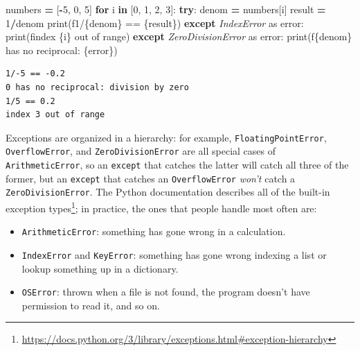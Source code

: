 \documentclass[
]{krantz}
\makeatletter
\newenvironment{Shaded}{\begin{snugshade}}{\end{snugshade}}
\newcommand{\BuiltInTok}[1]{#1}
\newcommand{\ControlFlowTok}[1]{\textcolor[rgb]{0.13,0.29,0.53}{\textbf{#1}}}
\newcommand{\DecValTok}[1]{\textcolor[rgb]{0.00,0.00,0.81}{#1}}
\newcommand{\ImportTok}[1]{#1}
\newcommand{\KeywordTok}[1]{\textcolor[rgb]{0.13,0.29,0.53}{\textbf{#1}}}
\newcommand{\NormalTok}[1]{#1}
\newcommand{\OperatorTok}[1]{\textcolor[rgb]{0.81,0.36,0.00}{\textbf{#1}}}
\newcommand{\PreprocessorTok}[1]{\textcolor[rgb]{0.56,0.35,0.01}{\textit{#1}}}
\newcommand{\SpecialCharTok}[1]{\textcolor[rgb]{0.00,0.00,0.00}{#1}}
\newcommand{\SpecialStringTok}[1]{\textcolor[rgb]{0.31,0.60,0.02}{#1}}
\providecommand{\tightlist}{%
  \setlength{\itemsep}{0pt}\setlength{\parskip}{0pt}}
\renewcommand{\href}[2]{#2\footnote{\url{#1}}}
\newenvironment{kframe}{%
\medskip{}
\setlength{\fboxsep}{.8em}
 \def\at@end@of@kframe{}%
 \ifinner\ifhmode%
  \def\at@end@of@kframe{\end{minipage}}%
  \begin{minipage}{\columnwidth}%
 \fi\fi%
 \def\FrameCommand##1{\hskip\@totalleftmargin \hskip-\fboxsep
 \colorbox{shadecolor}{##1}\hskip-\fboxsep
     \hskip-\linewidth \hskip-\@totalleftmargin \hskip\columnwidth}%
 \MakeFramed {\advance\hsize-\width
   \@totalleftmargin\z@ \linewidth\hsize
   \@setminipage}}%
 {\par\unskip\endMakeFramed%
 \at@end@of@kframe}
\renewenvironment{Shaded}{\begin{kframe}}{\end{kframe}}
\makeatother
\begin{document}
\begin{Shaded}
\begin{Highlighting}[]
\NormalTok{numbers }\OperatorTok{=}\NormalTok{ [}\OperatorTok{{-}}\DecValTok{5}\NormalTok{, }\DecValTok{0}\NormalTok{, }\DecValTok{5}\NormalTok{]}
\ControlFlowTok{for}\NormalTok{ i }\KeywordTok{in}\NormalTok{ [}\DecValTok{0}\NormalTok{, }\DecValTok{1}\NormalTok{, }\DecValTok{2}\NormalTok{, }\DecValTok{3}\NormalTok{]:}
    \ControlFlowTok{try}\NormalTok{:}
\NormalTok{        denom }\OperatorTok{=}\NormalTok{ numbers[i]}
\NormalTok{        result }\OperatorTok{=} \DecValTok{1}\OperatorTok{/}\NormalTok{denom}
        \BuiltInTok{print}\NormalTok{(}\SpecialStringTok{f\textquotesingle{}1/}\SpecialCharTok{\{}\NormalTok{denom}\SpecialCharTok{\}}\SpecialStringTok{ == }\SpecialCharTok{\{}\NormalTok{result}\SpecialCharTok{\}}\SpecialStringTok{\textquotesingle{}}\NormalTok{)}
    \ControlFlowTok{except} \PreprocessorTok{IndexError} \ImportTok{as}\NormalTok{ error:}
        \BuiltInTok{print}\NormalTok{(}\SpecialStringTok{f\textquotesingle{}index }\SpecialCharTok{\{i\}}\SpecialStringTok{ out of range\textquotesingle{}}\NormalTok{)}
    \ControlFlowTok{except} \PreprocessorTok{ZeroDivisionError} \ImportTok{as}\NormalTok{ error:}
        \BuiltInTok{print}\NormalTok{(}\SpecialStringTok{f\textquotesingle{}}\SpecialCharTok{\{}\NormalTok{denom}\SpecialCharTok{\}}\SpecialStringTok{ has no reciprocal: }\SpecialCharTok{\{}\NormalTok{error}\SpecialCharTok{\}}\SpecialStringTok{\textquotesingle{}}\NormalTok{)}
\end{Highlighting}
\end{Shaded}

\begin{verbatim}
1/-5 == -0.2
0 has no reciprocal: division by zero
1/5 == 0.2
index 3 out of range
\end{verbatim}

Exceptions are organized in a hierarchy:
for example,
\texttt{FloatingPointError}, \texttt{OverflowError}, and \texttt{ZeroDivisionError}
are all special cases of \texttt{ArithmeticError},
so an \texttt{except} that catches the latter will catch all three of the former,
but an \texttt{except} that catches an \texttt{OverflowError}
\emph{won't} catch a \texttt{ZeroDivisionError}.
The Python documentation describes all of \href{https://docs.python.org/3/library/exceptions.html\#exception-hierarchy}{the built-in exception types};
in practice,
the ones that people handle most often are:

\begin{itemize}
\tightlist
\item
  \texttt{ArithmeticError}:
  something has gone wrong in a calculation.
\item
  \texttt{IndexError} and \texttt{KeyError}:
  something has gone wrong indexing a list or lookup something up in a dictionary.
\item
  \texttt{OSError}:
  thrown when a file is not found,
  the program doesn't have permission to read it,
  and so on.
\end{itemize}
\end{document}
